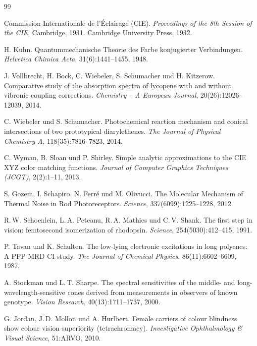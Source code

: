 ﻿\documentclass[a4paper,12pt]{article}
\theoremstyle{definition}
\begin{document}
\begin{thebibliography}{99}

Commission Internationale de l'Éclairage (CIE).
\textit{Proceedings of the 8th Session of the CIE}, Cambridge, 1931.
Cambridge University Press, 1932.

H. Kuhn.
Quantummechanische Theorie des Farbe konjugierter Verbindungen.
\textit{Helvetica Chimica Acta}, 31(6):1441--1455, 1948.

J. Vollbrecht, H. Bock, C. Wiebeler, S. Schumacher und H. Kitzerow.
Comparative study of the absorption spectra of lycopene with and without vibronic coupling corrections.
\textit{Chemistry -- A European Journal}, 20(26):12026--12039, 2014.

C. Wiebeler und S. Schumacher.
Photochemical reaction mechanism and conical intersections of two prototypical diarylethenes.
\textit{The Journal of Physical Chemistry A}, 118(35):7816--7823, 2014.

C. Wyman, B. Sloan und P. Shirley.
Simple analytic approximations to the CIE XYZ color matching functions.
\textit{Journal of Computer Graphics Techniques (JCGT)}, 2(2):1--11, 2013.

S. Gozem, I. Schapiro, N. Ferré und M. Olivucci.
The Molecular Mechanism of Thermal Noise in Rod Photoreceptors.
\textit{Science}, 337(6099):1225--1228, 2012.

R.\,W. Schoenlein, L.\,A. Peteanu, R.\,A. Mathies und C.\,V. Shank.
The first step in vision: femtosecond isomerization of rhodopsin.
\textit{Science}, 254(5030):412--415, 1991.

P. Tavan und K. Schulten.
The low-lying electronic excitations in long polyenes: A PPP-MRD-CI study.
\textit{The Journal of Chemical Physics}, 86(11):6602--6609, 1987.

A. Stockman und L.\,T. Sharpe.
The spectral sensitivities of the middle- and long-wavelength-sensitive cones derived from measurements in observers of known genotype.
\textit{Vision Research}, 40(13):1711--1737, 2000.

G. Jordan, J.\,D. Mollon und A. Hurlbert.
Female carriers of colour blindness show colour vision superiority (tetrachromacy).
\textit{Investigative Ophthalmology \& Visual Science}, 51:ARVO, 2010.


\end{thebibliography}
\end{document}
